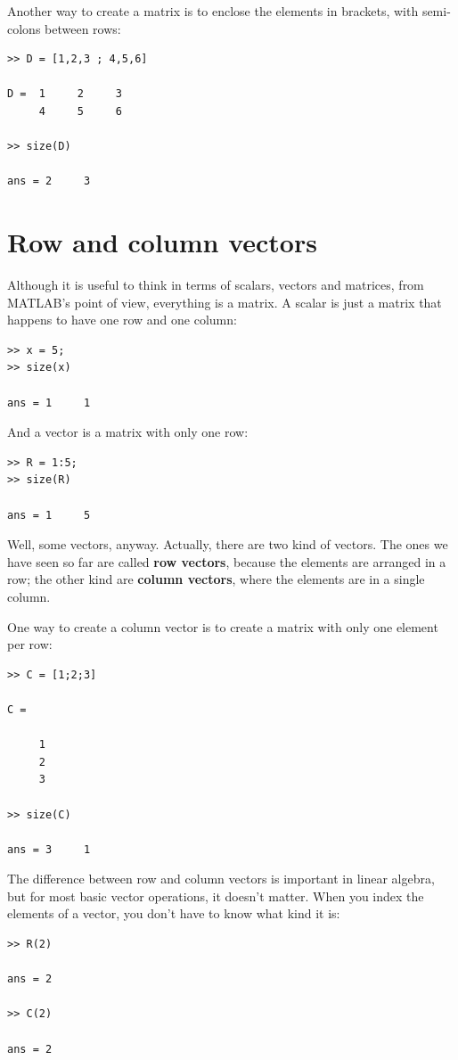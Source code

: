 \documentclass{book}
\begin{document}
Another way to create a matrix is to enclose the elements in
brackets, with semi-colons between rows:

\begin{verbatim}
>> D = [1,2,3 ; 4,5,6]

D =  1     2     3
     4     5     6

>> size(D)

ans = 2     3
\end{verbatim}


\section{Row and column vectors}

Although it is useful to think in terms of scalars, vectors and matrices,
from MATLAB's point of view, everything is a matrix.  A scalar
is just a matrix that happens to have one row and one column:

\begin{verbatim}
>> x = 5;
>> size(x)

ans = 1     1
\end{verbatim}

And a vector is a matrix with only one row:

\begin{verbatim}
>> R = 1:5;
>> size(R)

ans = 1     5
\end{verbatim}

Well, some vectors, anyway.  Actually, there are two kind
of vectors.  The ones we have seen so far are called {\bf row vectors},
because the elements are arranged in a row; the other kind are
{\bf column vectors}, where the elements are in a single column.

One way to create a column vector is to create a matrix with only
one element per row:

\begin{verbatim}
>> C = [1;2;3]

C =

     1
     2
     3

>> size(C)

ans = 3     1
\end{verbatim}

The difference between row and column vectors is important in
linear algebra, but for
most basic vector operations, it doesn't matter.  When you
index the elements of a vector, you don't have to know what kind
it is:

\begin{verbatim}
>> R(2)

ans = 2

>> C(2)

ans = 2
\end{verbatim}
\end{document}
